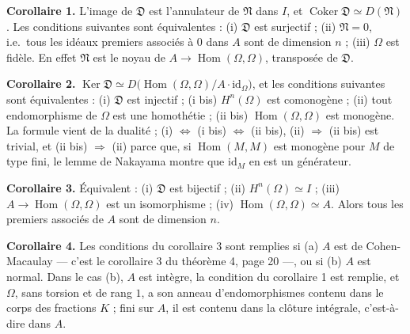 \documentclass[11pt,a4paper]{article}
\begin{document}
\textbf{Corollaire 1.} L'image de $\mathfrak{D}$ est l'annulateur de
$\mathfrak{N}$ dans $I$, et $\operatorname{Coker} \mathfrak{D} \simeq
D(\mathfrak{N})$. Les conditions suivantes sont équivalentes : (i)
$\mathfrak{D}$ est surjectif ; (ii) $\mathfrak{N} = 0$, i.e.\ tous les idéaux
premiers associés à $0$ dans $A$ sont de dimension $n$ ; (iii) $\Omega$ est
fidèle. En effet $\mathfrak{N}$ est le noyau de $A \to \operatorname{Hom}(\Omega,
\Omega)$, transposée de $\mathfrak{D}$.

\textbf{Corollaire 2.} $\operatorname{Ker} \mathfrak{D} \simeq
D\bigl(\operatorname{Hom}(\Omega, \Omega)/A \cdot \mathrm{id}_{\Omega}\bigr)$,
et les conditions suivantes sont équivalentes : (i) $\mathfrak{D}$ est
injectif ; (i bis) $H^n(\Omega)$ est comonogène ; (ii) tout endomorphisme de
$\Omega$ est une homothétie ; (ii bis) $\operatorname{Hom}(\Omega, \Omega)$ est
monogène. La formule vient de la dualité ; (i) $\Leftrightarrow$ (i bis)
$\Leftrightarrow$ (ii bis), (ii) $\Rightarrow$ (ii bis) est trivial, et (ii bis)
$\Rightarrow$ (ii) parce que, si $\operatorname{Hom}(M, M)$ est monogène pour
$M$ de type fini, le lemme de Nakayama montre que $\mathrm{id}_M$ en est un
générateur.

\textbf{Corollaire 3.} Équivalent : (i) $\mathfrak{D}$ est bijectif ; (ii)
$H^n(\Omega) \simeq I$ ; (iii) $A \to \operatorname{Hom}(\Omega, \Omega)$ est
un isomorphisme ; (iv) $\operatorname{Hom}(\Omega, \Omega) \simeq A$. Alors
tous les premiers associés de $A$ sont de dimension $n$.

\textbf{Corollaire 4.} Les conditions du corollaire 3 sont remplies si (a) $A$
est de Cohen-Macaulay --- c'est le corollaire 3 du théorème 4, page 20 ---, ou
si (b) $A$ est normal. Dans le cas (b), $A$ est intègre, la condition du
corollaire 1 est remplie, et $\Omega$, sans torsion et de rang $1$, a son
anneau d'endomorphismes contenu dans le corps des fractions $K$ ; fini sur $A$,
il est contenu dans la clôture intégrale, c'est-à-dire dans $A$.
\end{document}
